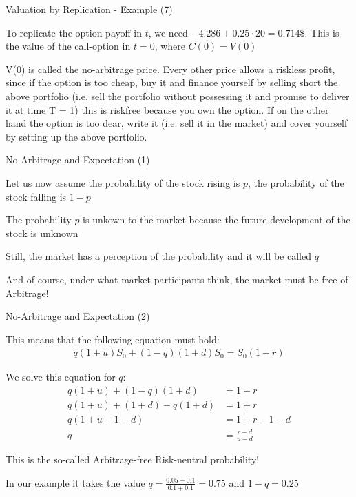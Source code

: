 
{Valuation by Replication - Example (7)}
\item To replicate the option payoff in $t$, we need $-4.286+0.25 \cdot 20 = 0.714 \$$. This is the value of the call-option in $t=0$, where $C(0)=V(0)$
\item V(0) is called the no-arbitrage price. Every other price allows a
riskless profit, since if the option is too cheap, buy it and
finance yourself by selling short the above portfolio (i.e. sell the
portfolio without possessing it and promise to deliver it at time
T = 1) this is riskfree because you own the option. If on the
other hand the option is too dear, write it (i.e. sell it in the
market) and cover yourself by setting up the above portfolio.

{No-Arbitrage and Expectation (1)}
  \item Let us now assume the probability of the stock rising is $p$, the probability of the stock falling is $1-p$
  \item The probability $p$ is unkown to the market because the future development of the stock is unknown
  \vspace{0.3cm}
  \item Still, the market has a perception of the probability and it will  be called $q$
  \item And of course, under what market participants think, the market must be free of Arbitrage!

{No-Arbitrage and Expectation (2)}
  \item This means that the following equation must hold:
  \begin{align*}
    q (1+u) S_0 + (1-q) (1+d) S_0 = S_0 (1+r)
  \end{align*}
  \item We solve this equation for $q$:
  \begin{align*}
    q (1+u) + (1-q) (1+d) & = 1+r \\
    q (1+u) + (1+d) -q (1+d) & = 1+r \\
    q (1+u - 1 -d) & = 1+r -1 - d\\
    q & = \frac{r-d}{u-d}
  \end{align*}
  \item This is the so-called Arbitrage-free Risk-neutral probability!
  \item In our example it takes the value $q = \frac{0.05 + 0.1}{0.1 + 0.1} = 0.75$ and $1-q=0.25$

